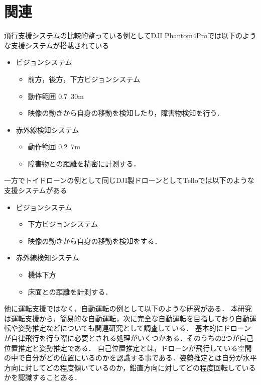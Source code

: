 \section{関連}
飛行支援システムの比較的整っている例としてDJI Phantom4Proでは以下のような支援システムが搭載されている
\begin{itemize}
  \item ビジョンシステム
  \begin{itemize}
    \item 前方，後方，下方ビジョンシステム 
    \item 動作範囲 0.7~30m 
    \item 映像の動きから自身の移動を検知したり，障害物検知を行う．
  \end{itemize}
  \item 赤外線検知システム
  \begin{itemize}
    \item 動作範囲 0.2~7m
    \item 障害物との距離を精密に計測する．
  \end{itemize}
\end{itemize}

一方でトイドローンの例として同じDJI製ドローンとしてTelloでは以下のような支援システムがある
\begin{itemize}
  \item ビジョンシステム
  \begin{itemize}
    \item 下方ビジョンシステム 
    \item 映像の動きから自身の移動を検知をする．
  \end{itemize}
  \item 赤外線検知システム
  \begin{itemize}
    \item 機体下方
    \item 床面との距離を計測する．
  \end{itemize}
\end{itemize}




他に運転支援ではなく，自動運転の例として以下のような研究がある．
本研究は運転支援から，簡易的な自動運転，次に完全な自動運転を目指しており自動運転や姿勢推定などについても関連研究として調査している．
基本的にドローンが自律飛行を行う際に必要とされる処理がいくつかある．そのうちの2つが自己位置推定と姿勢推定である．
自己位置推定とは，ドローンが飛行している空間の中で自分がどの位置にいるのかを認識する事である．姿勢推定とは自分が水平方向に対してどの程度傾いているのか，鉛直方向に対してどの程度回転しているかを認識することある．

